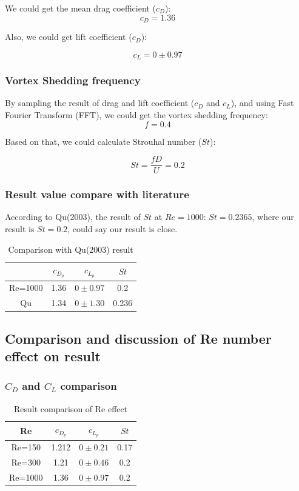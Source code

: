 \documentclass[12pt]{article}
\begin{document}
We could get the mean drag coefficient ($c_D$):
$$c_D = 1.36$$


Also, we could get lift coefficient ($c_D$):

$$c_L = 0 \pm 0.97$$



\subsubsection{Vortex Shedding frequency}

By sampling the result of drag and lift coefficient ($c_D$ and $c_L$), and using Fast Fourier Transform (FFT), we could get the vortex shedding frequency:
$$f = 0.4$$

Based on that, we could calculate Strouhal number ($St$):

$$St = \frac{f D}{U} = 0.2 $$


\subsubsection{Result value compare with literature}

According to Qu(2003)\cite{QU2013347}, the result of $St$ at $Re=1000$: $St = 0.2365$, where our result is $St = 0.2$, could say our result is close.

\begin{table}[ht]
\centering
\caption{Comparison with Qu(2003)\cite{QU2013347} result}
\begin{tabular}{c|ccc}
\toprule
 & $c_{D_p}$ & $c_{L_p}$ & $St$ \\
\midrule
Re=1000 & 1.36 & $0 \pm 0.97$ & 0.2 \\
Qu\cite{QU2013347} & 1.34 &  $0 \pm 1.30$ & 0.236 \\
\bottomrule
\end{tabular}
\end{table}


\subsection{Comparison and discussion of Re number effect on result}
\subsubsection{$C_D$ and $C_L $ comparison}

\begin{table}[H]
\centering
\caption{Result comparison of Re effect}
\begin{tabular}{c|ccc}
\toprule
Re & $c_{D_p}$ & $c_{L_p}$ & $St$ \\
\midrule
Re=150 & 1.212 & $0 \pm 0.21$ & 0.17 \\
Re=300 & 1.21 & $0 \pm 0.46$ & 0.2 \\
Re=1000 & 1.36 & $0 \pm 0.97$ & 0.2 \\
\bottomrule
\end{tabular}
\end{table}
\end{document}
